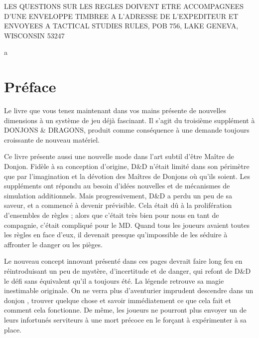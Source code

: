 \documentclass[12pt]{article}
\begin{document}
{\small \noindent LES QUESTIONS SUR LES REGLES DOIVENT ETRE ACCOMPAGNEES D'UNE ENVELOPPE TIMBREE A L'ADRESSE DE L'EXPEDITEUR ET ENVOYEES A TACTICAL STUDIES RULES, POB 756, LAKE GENEVA, WISCONSIN 53247}


\newpage
{\color{white}a}

\vfill


\newpage

\section*{Préface}

Le livre que vous tenez maintenant dans vos mains présente de nouvelles dimensions à un système de jeu déjà fascinant. Il s'agit du troisième supplément à DONJONS \& DRAGONS, produit comme conséquence à une demande toujours croissante de nouveau matériel.

Ce livre présente aussi une nouvelle mode dans l'art subtil d'être Maître de Donjon. Fidèle à sa conception d'origine, D\&D n'était limité dans son périmètre que par l'imagination et la dévotion des Maîtres de Donjons où qu'ils soient. Les suppléments ont répondu au besoin d'idées nouvelles et de mécanismes de simulation additionnels. Mais progressivement, D\&D a perdu un peu de sa saveur, et a commencé à devenir prévisible. Cela était dû à la prolifération d'ensembles de règles ; alors que c'était très bien pour nous en tant de compagnie, c'était compliqué pour le MD. Quand tous les joueurs avaient toutes les règles en face d'eux, il devenait presque qu'impossible de les séduire à affronter le danger ou les pièges.

Le nouveau concept innovant présenté dans ces pages devrait faire long feu en réintroduisant un peu de mystère, d'incertitude et de danger, qui refont de D\&D le défi sans équivalent qu'il a toujours été. La légende retrouve sa magie inestimable originale. On ne verra plus d'aventurier imprudent descendre dans un donjon , trouver quelque chose et savoir immédiatement ce que cela fait et comment cela fonctionne. De même, les joueurs ne pourront plus envoyer un de leurs infortunés serviteurs à une mort précoce en le forçant à expérimenter à sa place.
\end{document}

